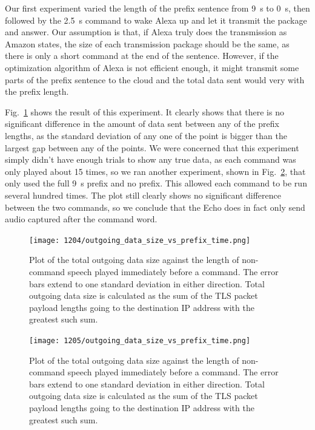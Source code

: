 Our first experiment varied the length of the prefix sentence from 9~s to 0~s, then followed by the 2.5~s command to wake Alexa up and let it transmit the package and answer. Our assumption is that, if Alexa truly does the transmission as Amazon states, the size of each transmission package should be the same, as there is only a short command at the end of the sentence. However, if the optimization algorithm of Alexa is not efficient enough, it might transmit some parts of the prefix sentence to the cloud and the total data sent would very with the prefix length. 

Fig.~\ref{fig:prefix_many} shows the result of this experiment. It clearly shows that there is no significant difference in the amount of data sent between any of the prefix lengths, as the standard deviation of any one of the point is bigger than the largest gap between any of the points. We were concerned that this experiment simply didn't have enough trials to show any true data, as each command was only played about 15 times, so we ran another experiment, shown in Fig.~\ref{fig:prefix_two}, that only used the full 9~s prefix and no prefix. This allowed each command to be run several hundred times. The plot still clearly shows no significant difference between the two commands, so we conclude that the Echo does in fact only send audio captured after the command word.
 
\begin{figure}[]
    \centering
    \texttt{[image: 1204/outgoing\_data\_size\_vs\_prefix\_time.png]}
    \caption{Plot of the total outgoing data size against the length of non-command speech played immediately before a command. The error bars extend to one standard deviation in either direction. Total outgoing data size is calculated as the sum of the TLS packet payload lengths going to the destination IP address with the greatest such sum.}
    \label{fig:prefix_many}
\end{figure}

\begin{figure}[]
    \centering
    \texttt{[image: 1205/outgoing\_data\_size\_vs\_prefix\_time.png]}
    \caption{Plot of the total outgoing data size against the length of non-command speech played immediately before a command. The error bars extend to one standard deviation in either direction. Total outgoing data size is calculated as the sum of the TLS packet payload lengths going to the destination IP address with the greatest such sum.}
    \label{fig:prefix_two}
\end{figure}




